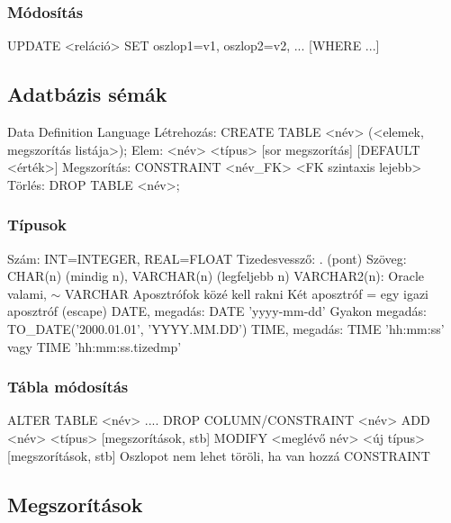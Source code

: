 \documentclass[12pt,a4paper]{article}
\begin{document}
\subsubsection{Módosítás}

\begin{outline}
	\1 UPDATE <reláció> SET oszlop1=v1, oszlop2=v2, ... [WHERE ...]
\end{outline}

\pagebreak

\subsection{Adatbázis sémák}

\begin{outline}
	\1 Data Definition Language
	\1 Létrehozás: CREATE TABLE <név> (<elemek, megszorítás listája>);
		\2 Elem: <név> <típus> [sor megszorítás] [DEFAULT <érték>]
		\2 Megszorítás: CONSTRAINT <név\_FK> <FK szintaxis lejebb>
	\1 Törlés: DROP TABLE <név>;
\end{outline}

\subsubsection{Típusok}

\begin{outline}
	\1 Szám: INT=INTEGER, REAL=FLOAT
		\2 Tizedesvessző: . (pont)
	\1 Szöveg: CHAR(n) (mindig n), VARCHAR(n) (legfeljebb n)
		\2 VARCHAR2(n): Oracle valami, $\sim$ VARCHAR
		\2 Aposztrófok közé kell rakni
		\2 Két aposztróf = egy igazi aposztróf (escape)
	\1 DATE, megadás: DATE 'yyyy-mm-dd'
		\2 Gyakon megadás: TO\_DATE('2000.01.01', 'YYYY.MM.DD')
	\1 TIME, megadás: TIME 'hh:mm:ss' vagy TIME 'hh:mm:ss.tizedmp'
\end{outline}

\subsubsection{Tábla módosítás}

\begin{outline}
	\1 ALTER TABLE <név> ....
		\2 DROP COLUMN/CONSTRAINT <név>
		\2 ADD <név> <típus> [megszorítások, stb]
		\2 MODIFY <meglévő név> <új típus> [megszorítások, stb]
	\1 Oszlopot nem lehet töröli, ha van hozzá CONSTRAINT
\end{outline}

\pagebreak

\subsection{Megszorítások}
\end{document}
